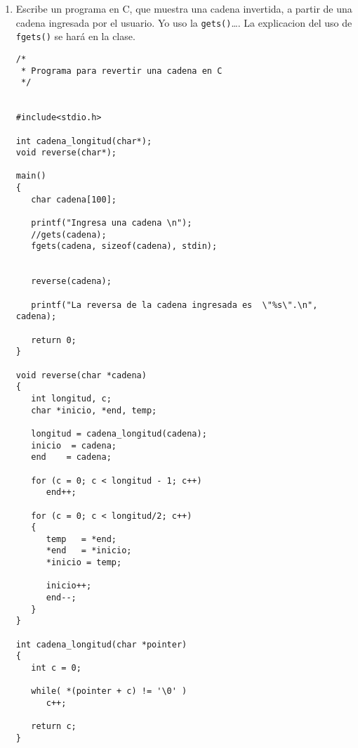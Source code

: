 \documentclass[twoside,10.5pt]{article}%
\begin{document}
\begin{enumerate}
\begin{verbatim}
  /*
   *Ponemos el puntero al elemento propio de la criba
   *paramos si nos pasamos  
   */
  sp = &criba[0] + (numero-3 )/2;
  if( sp >= &criba[ SIZE ] )
      break;
/*
 * Ahora avanzamos el puntero por multiplos del numero
 * y colocamos cada subsucesion FALSE.
*/
while( sp += numero, sp < &criba[ SIZE ] )
   *sp = FALSE;
}
/*
* Vamos a traves de la criba y imprimimos los
*  numeros correspondiendo a las localizaciones que 
* permanecen TRUE.
*/
printf("2\n");
for( numero = 3, sp = &criba[ 0 ];
  sp < &criba[ SIZE ]; numero += 2, sp++ ){
    if( *sp )
      printf( "%d\n", numero );
    }
  return EXIT_SUCCESS;
}
\end{verbatim}


\item Escribe un programa en C, que muestra una cadena invertida, a partir de una cadena \mbox{ingresada} por el usuario. Yo uso la \texttt{gets()}\dots. La explicacion del uso de \texttt{fgets()} se har\'a en la clase.

\begin{verbatim}
/*
 * Programa para revertir una cadena en C
 */


#include<stdio.h>
 
int cadena_longitud(char*);
void reverse(char*);
 
main() 
{
   char cadena[100];
 
   printf("Ingresa una cadena \n");
   //gets(cadena);
   fgets(cadena, sizeof(cadena), stdin);
    
 
   reverse(cadena);
 
   printf("La reversa de la cadena ingresada es  \"%s\".\n", cadena);
 
   return 0;
}
 
void reverse(char *cadena) 
{
   int longitud, c;
   char *inicio, *end, temp;
 
   longitud = cadena_longitud(cadena);
   inicio  = cadena;
   end    = cadena;
 
   for (c = 0; c < longitud - 1; c++)
      end++;
 
   for (c = 0; c < longitud/2; c++)
   {        
      temp   = *end;
      *end   = *inicio;
      *inicio = temp;
 
      inicio++;
      end--;
   }
}
 
int cadena_longitud(char *pointer)
{
   int c = 0;
 
   while( *(pointer + c) != '\0' )
      c++;
 
   return c;
}
\end{verbatim}
\end{enumerate}
\end{document}
